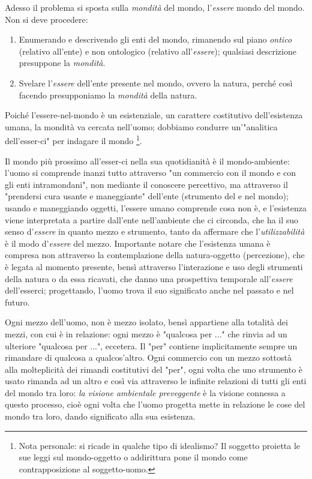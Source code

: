 \documentclass[a4paper,12pt,oneside]{article}%
\begin{document}
Adesso il problema si sposta sulla \textit{mondità} del mondo, l'\textit{essere} mondo del mondo. Non si deve procedere:

\begin{enumerate}
	\item Enumerando e descrivendo gli enti del mondo, rimanendo sul piano \textit{ontico} (relativo all'ente) e non ontologico (relativo all'\textit{essere}); qualsiasi descrizione presuppone la \textit{mondità}.
	\item Svelare l'\textit{essere} dell'ente presente nel mondo, ovvero la natura, perché così facendo presupponiamo la \textit{mondità} della natura.
\end{enumerate}

Poiché l'essere-nel-mondo è un esistenziale, un carattere costitutivo dell'esistenza umana, la mondità va cercata nell'uomo; dobbiamo condurre un'"analitica dell'esser-ci" per indagare il mondo \footnote{Nota personale: si ricade in qualche tipo di idealismo? Il soggetto proietta le sue leggi sul mondo-oggetto o addirittura pone il mondo come contrapposizione al soggetto-uomo.}.
	
Il mondo più prossimo all'esser-ci nella sua quotidianità è il mondo-ambiente: l'uomo si comprende inanzi tutto attraverso "un commercio con il mondo e con gli enti intramondani", non mediante il conoscere percettivo, ma attraverso il "prendersi cura usante e maneggiante" dell'ente (strumento del e nel mondo); usando e maneggiando oggetti, l'essere umano comprende cosa non è, e l'esistenza viene interpretata a partire dall'ente nell'ambiente che ci circonda, che ha il suo senso d'\textit{essere} in quanto mezzo e strumento, tanto da affermare che l'\textit{utilizzabilità} è il modo d'\textit{essere} del mezzo. Importante notare che l'esistenza umana è compresa non attraverso la contemplazione della natura-oggetto (percezione), che è legata al momento presente, bensì attraverso l'interazione e uso degli strumenti della natura o da essa ricavati, che danno una prospettiva temporale all'\textit{essere} dell'esserci; progettando, l'uomo trova il suo significato anche nel passato e nel futuro.


Ogni mezzo dell'uomo, non è mezzo isolato, bensì appartiene alla totalità dei mezzi, con cui è in relazione: ogni mezzo è "qualcosa per ..." che rinvia ad un ulteriore "qualcosa per ...", eccetera. Il "per" contiene implicitamente sempre un rimandare di qualcosa a qualcos'altro. Ogni commercio con un mezzo sottostà alla molteplicità dei rimandi costitutivi del "per", ogni volta che uno strumento è usato rimanda ad un altro e così via attraverso le infinite relazioni di tutti gli enti del mondo tra loro: \textit{la visione ambientale preveggente} è la visione connessa a questo processo, cioè ogni volta che l'uomo progetta mette in relazione le cose del mondo tra loro, dando significato alla sua esistenza.
\end{document}
